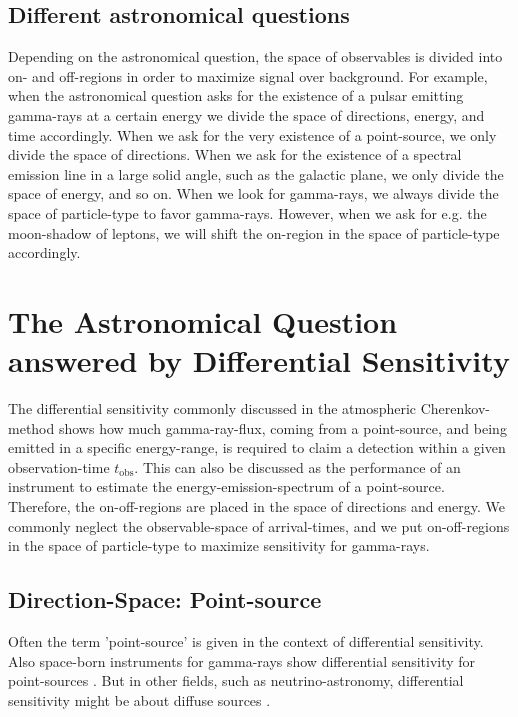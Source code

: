 \documentclass{article}%
\begin{document}
\subsection*{Different astronomical questions}
Depending on the astronomical question, the space of observables is divided into on- and off-regions in order to maximize signal over background.
%
For example, when the astronomical question asks for the existence of a pulsar emitting gamma-rays at a certain energy we divide the space of directions, energy, and time accordingly.
%
When we ask for the very existence of a point-source, we only divide the space of directions.
%
When we ask for the existence of a spectral emission line in a large solid angle, such as the galactic plane, we only divide the space of energy, and so on.
%
When we look for gamma-rays, we always divide the space of particle-type to favor gamma-rays.
%
However, when we ask for e.g. the moon-shadow of leptons, we will shift the on-region in the space of particle-type accordingly.
%
\section{The Astronomical Question answered by Differential Sensitivity}
\label{SecAstronomicalQuastion}
The differential sensitivity commonly discussed in the atmospheric Cherenkov-method shows how much gamma-ray-flux, coming from a point-source, and being emitted in a specific energy-range, is required to claim a detection within a given observation-time $t_\text{obs}$.
%
This can also be discussed as the performance of an instrument to estimate the energy-emission-spectrum of a point-source.\\
%
Therefore, the on-off-regions are placed in the space of directions and energy.
%
We commonly neglect the observable-space of arrival-times, and we put on-off-regions in the space of particle-type to maximize sensitivity for gamma-rays.
%
\subsection*{Direction-Space: Point-source}
%
Often \cite{cta2018baseline,cortina2016machete} the term 'point-source' is given in the context of differential sensitivity.
%
Also space-born instruments for gamma-rays show differential sensitivity for point-sources \cite{wood2016fermiperformance}.
%
But in other fields, such as neutrino-astronomy, differential sensitivity might be about diffuse sources \cite{marinelli2021km3netarca}.
%
\end{document}
